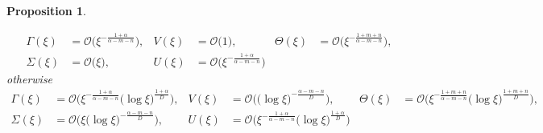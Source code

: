 \documentclass[a4paper,11pt]{article}
\def\BO{{\mathcal{O}}}
\newtheorem{proposition}{Proposition}[section]
\begin{document}
\begin{proposition}
\begin{enumerate}
  \begin{equation} \label{eq:ss_asymp1}
  \begin{aligned}
    \Gamma(\xi) &= \BO\big(\xi^{-\frac{1+\alpha}{\alpha-m-n}}), & V(\xi) &= \BO\big(1), &    \Theta(\xi) &= \BO\big(\xi^{-\frac{1+m+n}{\alpha-m-n}}),\\
   \Sigma(\xi) &= \BO\big(\xi), &   U(\xi) &= \BO\big(\xi^{-\frac{1+\alpha}{\alpha-m-n}})
  \end{aligned}
  \end{equation}
  otherwise
    \begin{equation} \label{eq:ss_asymp2}
  \begin{aligned}
    \Gamma(\xi) &= \BO\big(\xi^{-\frac{1+\alpha}{\alpha-m-n}}\big(\log\xi\big)^{\frac{1+\alpha}{D}}\big), & V(\xi) &= \BO\big(\big(\log\xi\big)^{-\frac{\alpha-m-n}{D}}\big), &    \Theta(\xi) &= \BO\big(\xi^{-\frac{1+m+n}{\alpha-m-n}}\big(\log\xi\big)^{\frac{1+m+n}{D}}\big),\\
   \Sigma(\xi) &= \BO\big(\xi\big(\log\xi\big)^{-\frac{\alpha-m-n}{D}}\big), &   U(\xi) &= \BO\big(\xi^{-\frac{1+\alpha}{\alpha-m-n}}\big(\log\xi\big)^{\frac{1+\alpha}{D}}\big)
  \end{aligned}
  \end{equation}
 \end{enumerate}
 
\end{proposition}
\end{document}

